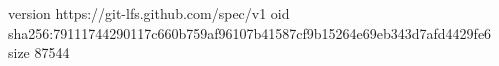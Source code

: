 version https://git-lfs.github.com/spec/v1
oid sha256:79111744290117c660b759af96107b41587cf9b15264e69eb343d7afd4429fe6
size 87544
